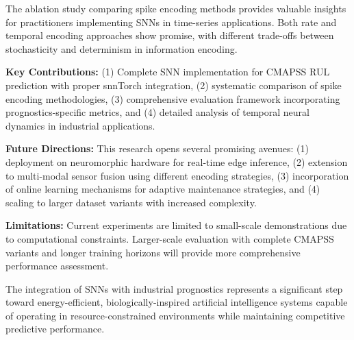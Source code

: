 \documentclass[11pt]{article}
\begin{document}
The ablation study comparing spike encoding methods provides valuable insights for practitioners implementing SNNs in time-series applications. Both rate and temporal encoding approaches show promise, with different trade-offs between stochasticity and determinism in information encoding.

\textbf{Key Contributions:} (1) Complete SNN implementation for CMAPSS RUL prediction with proper snnTorch integration, (2) systematic comparison of spike encoding methodologies, (3) comprehensive evaluation framework incorporating prognostics-specific metrics, and (4) detailed analysis of temporal neural dynamics in industrial applications.

\textbf{Future Directions:} This research opens several promising avenues: (1) deployment on neuromorphic hardware for real-time edge inference, (2) extension to multi-modal sensor fusion using different encoding strategies, (3) incorporation of online learning mechanisms for adaptive maintenance strategies, and (4) scaling to larger dataset variants with increased complexity.

\textbf{Limitations:} Current experiments are limited to small-scale demonstrations due to computational constraints. Larger-scale evaluation with complete CMAPSS variants and longer training horizons will provide more comprehensive performance assessment.

The integration of SNNs with industrial prognostics represents a significant step toward energy-efficient, biologically-inspired artificial intelligence systems capable of operating in resource-constrained environments while maintaining competitive predictive performance.
\end{document}
